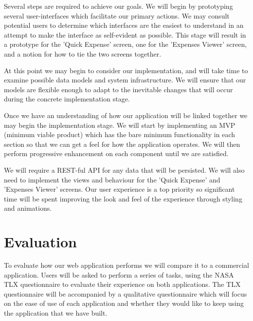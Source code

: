 \documentclass{chi2011}
\begin{document}
Several steps are required to achieve our goals. We will begin by prototyping several user-interfaces which facilitate
our primary actions. We may consult potential users to determine which interfaces are the easiest to understand in an
attempt to make the interface as self-evident as possible. This stage will result in a prototype for the 'Quick
Expense' screen, one for the 'Expenses Viewer' screen, and a notion for how to tie the two screens together.

At this point we may begin to consider our implementation, and will take time to examine possible data models and
system infrastructure. We will ensure that our models are flexible enough to adapt to the inevitable changes that will
occur during the concrete implementation stage.

Once we have an understanding of how our application will be linked together we may begin the implementation stage. We
will start by implementing an MVP (minimum viable product) which has the bare minimum functionality in each section so
that we can get a feel for how the application operates. We will then perform progressive enhancement on each component
until we are satisfied.

We will require a REST-ful API for any data that will be persisted. We will also need to implement the views and
behaviour for the 'Quick Expense' and 'Expenses Viewer' screens. Our user experience is a top priority so 
significant time will be spent improving the look and feel of the experience through styling and animations.

\section{Evaluation}

To evaluate how our web application performs we will compare it to a commercial application. Users
will be asked to perform a series of tasks, using the NASA TLX questionnaire to evaluate their experience
on both applications. The TLX questionnaire will be accompanied by a qualitative questionnaire 
which will focus on the ease of use of each application and whether they would like to keep using the
application that we have built.
%  
\end{document}
